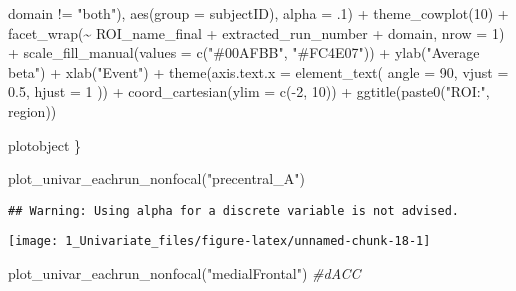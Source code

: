\documentclass[
]{article}
\newenvironment{Shaded}{\begin{snugshade}}{\end{snugshade}}
\newcommand{\AttributeTok}[1]{\textcolor[rgb]{0.77,0.63,0.00}{#1}}
\newcommand{\CommentTok}[1]{\textcolor[rgb]{0.56,0.35,0.01}{\textit{#1}}}
\newcommand{\DecValTok}[1]{\textcolor[rgb]{0.00,0.00,0.81}{#1}}
\newcommand{\FloatTok}[1]{\textcolor[rgb]{0.00,0.00,0.81}{#1}}
\newcommand{\FunctionTok}[1]{\textcolor[rgb]{0.00,0.00,0.00}{#1}}
\newcommand{\NormalTok}[1]{#1}
\newcommand{\SpecialCharTok}[1]{\textcolor[rgb]{0.00,0.00,0.00}{#1}}
\newcommand{\StringTok}[1]{\textcolor[rgb]{0.31,0.60,0.02}{#1}}
\begin{document}
\begin{Shaded}
\begin{Highlighting}[]
\NormalTok{                    domain }\SpecialCharTok{!=} \StringTok{"both"}\NormalTok{), }
             \FunctionTok{aes}\NormalTok{(}\AttributeTok{group =}
\NormalTok{                    subjectID),}
              \AttributeTok{alpha =}\NormalTok{ .}\DecValTok{1}\NormalTok{) }\SpecialCharTok{+}
    \FunctionTok{theme\_cowplot}\NormalTok{(}\DecValTok{10}\NormalTok{) }\SpecialCharTok{+}
    \FunctionTok{facet\_wrap}\NormalTok{(}\SpecialCharTok{\textasciitilde{}}\NormalTok{ ROI\_name\_final }\SpecialCharTok{+}\NormalTok{ extracted\_run\_number }\SpecialCharTok{+}\NormalTok{ domain, }\AttributeTok{nrow =} \DecValTok{1}\NormalTok{) }\SpecialCharTok{+}
    \FunctionTok{scale\_fill\_manual}\NormalTok{(}\AttributeTok{values =} \FunctionTok{c}\NormalTok{(}\StringTok{"\#00AFBB"}\NormalTok{, }\StringTok{"\#FC4E07"}\NormalTok{)) }\SpecialCharTok{+}
    \FunctionTok{ylab}\NormalTok{(}\StringTok{"Average beta"}\NormalTok{) }\SpecialCharTok{+}
    \FunctionTok{xlab}\NormalTok{(}\StringTok{"Event"}\NormalTok{) }\SpecialCharTok{+}
    \FunctionTok{theme}\NormalTok{(}\AttributeTok{axis.text.x =} \FunctionTok{element\_text}\NormalTok{(}
      \AttributeTok{angle =} \DecValTok{90}\NormalTok{,}
      \AttributeTok{vjust =} \FloatTok{0.5}\NormalTok{,}
      \AttributeTok{hjust =} \DecValTok{1}
\NormalTok{    )) }\SpecialCharTok{+}
    \FunctionTok{coord\_cartesian}\NormalTok{(}\AttributeTok{ylim =} \FunctionTok{c}\NormalTok{(}\SpecialCharTok{{-}}\DecValTok{2}\NormalTok{, }\DecValTok{10}\NormalTok{)) }\SpecialCharTok{+}
    \FunctionTok{ggtitle}\NormalTok{(}\FunctionTok{paste0}\NormalTok{(}\StringTok{"ROI:"}\NormalTok{, region))}
  
\NormalTok{  plotobject}
\NormalTok{\}}
\end{Highlighting}
\end{Shaded}

\begin{Shaded}
\begin{Highlighting}[]
\FunctionTok{plot\_univar\_eachrun\_nonfocal}\NormalTok{(}\StringTok{"precentral\_A"}\NormalTok{)}
\end{Highlighting}
\end{Shaded}

\begin{verbatim}
## Warning: Using alpha for a discrete variable is not advised.
\end{verbatim}

\texttt{[image: 1\_Univariate\_files/figure-latex/unnamed-chunk-18-1]}

\begin{Shaded}
\begin{Highlighting}[]
\FunctionTok{plot\_univar\_eachrun\_nonfocal}\NormalTok{(}\StringTok{"medialFrontal"}\NormalTok{) }\CommentTok{\#dACC}
\end{Highlighting}
\end{Shaded}
\end{document}
